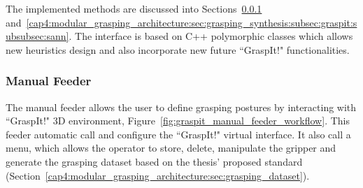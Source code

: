 \begin{figure}[h!]
\end{figure}

The implemented methods are discussed into Sections~\ref{cap4:modular_grasping_architecture:sec:grasping_synthesis:subsec:graspit:subsubsec:manual} and~\ref{cap4:modular_grasping_architecture:sec:grasping_synthesis:subsec:graspit:subsubsec:sann}. The interface is based on C++ polymorphic classes which allows new heuristics design and also incorporate new future ``GraspIt!" functionalities. 

\subsubsection{Manual Feeder}
\label{cap4:modular_grasping_architecture:sec:grasping_synthesis:subsec:graspit:subsubsec:manual}

The manual feeder allows the user to define grasping postures by interacting with ``GraspIt!" 3D environment, Figure~\ref{fig:graspit_manual_feeder_workflow}. This feeder automatic call and configure the ``GraspIt!" virtual interface. It also call a menu, which allows the operator to store, delete, manipulate the gripper and generate the grasping dataset based on the thesis' proposed standard (Section~\ref{cap4:modular_grasping_architecture:sec:grasping_dataset}).

